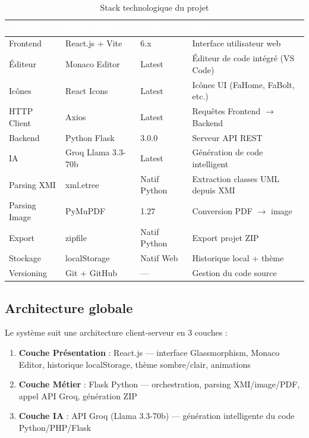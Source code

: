 \documentclass[12pt,a4paper]{article}
\begin{document}
\begin{table}[H]
\centering
\renewcommand{\arraystretch}{1.3}
\begin{tabularx}{\textwidth}{|l|l|l|X|}
\hline
\rowcolor{darkblue!90}
\textcolor{white}{\textbf{Couche}} &
\textcolor{white}{\textbf{Technologie}} &
\textcolor{white}{\textbf{Version}} &
\textcolor{white}{\textbf{Rôle}} \\
\hline
Frontend & React.js + Vite & 6.x & Interface utilisateur web \\
\hline
\rowcolor{lightgray}
Éditeur & Monaco Editor & Latest & Éditeur de code intégré (VS Code) \\
\hline
Icônes & React Icons & Latest & Icônes UI (FaHome, FaBolt, etc.) \\
\hline
\rowcolor{lightgray}
HTTP Client & Axios & Latest & Requêtes Frontend $\rightarrow$ Backend \\
\hline
Backend & Python Flask & 3.0.0 & Serveur API REST \\
\hline
\rowcolor{lightgray}
IA & Groq Llama 3.3-70b & Latest & Génération de code intelligent \\
\hline
Parsing XMI & xml.etree & Natif Python & Extraction classes UML depuis XMI \\
\hline
\rowcolor{lightgray}
Parsing Image & PyMuPDF & 1.27 & Conversion PDF $\rightarrow$ image \\
\hline
Export & zipfile & Natif Python & Export projet ZIP \\
\hline
\rowcolor{lightgray}
Stockage & localStorage & Natif Web & Historique local + thème \\
\hline
Versioning & Git + GitHub & — & Gestion du code source \\
\hline
\end{tabularx}
\caption{Stack technologique du projet}
\end{table}

\subsection{Architecture globale}

Le système suit une architecture client-serveur en 3 couches :

\begin{enumerate}[leftmargin=1.5em]
  \item \textbf{Couche Présentation} : React.js — interface Glassmorphism, Monaco Editor, historique localStorage, thème sombre/clair, animations
  \item \textbf{Couche Métier} : Flask Python — orchestration, parsing XMI/image/PDF, appel API Groq, génération ZIP
  \item \textbf{Couche IA} : API Groq (Llama 3.3-70b) — génération intelligente du code Python/PHP/Flask
\end{enumerate}
\end{document}
